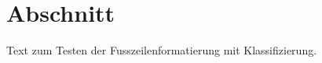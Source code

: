 \documentclass{swisstex}
\begin{document}
\section{Abschnitt}
Text zum Testen der Fusszeilenformatierung mit Klassifizierung.
\end{document}
